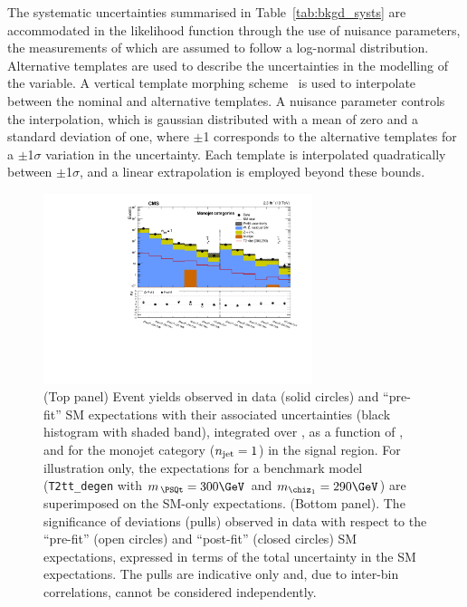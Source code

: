 The systematic uncertainties summarised in Table~\ref{tab:bkgd_systs}
are accommodated in the likelihood function through the use of
nuisance parameters, the measurements of which are assumed to follow a
log-normal distribution. Alternative templates are used to describe
the uncertainties in the modelling of the \HTmiss variable. A vertical
template morphing scheme~\cite{Prosper:2011zz} is used to interpolate
between the nominal and alternative \HTmiss templates. A nuisance
parameter controls the interpolation, which is gaussian distributed
with a mean of zero and a standard deviation of one, where $\pm$1
corresponds to the alternative templates for a $\pm$1$\sigma$
variation in the uncertainty. Each template is interpolated
quadratically between $\pm$1$\sigma$, and a linear extrapolation is
employed beyond these bounds.

\begin{figure}[!h]
  \begin{center}
    \includegraphics[width=0.7\textwidth]{figures/result/v1/summaryPlot_Monojet_prefit_overlay_fit_b}
    \caption{(Top panel) Event yields observed in data (solid circles)
      and ``pre-fit'' SM expectations with their associated
      uncertainties (black histogram with shaded band), integrated
      over \HTmiss, as a function of \nb, and \scalht for the monojet
      category ($n_{\text{jet}} = 1$) in the signal region. For illustration
      only, the expectations for a benchmark model
      (\texttt{T2tt\_degen} with $m_{\,\PSQt} = 300\GeV$ and
      $m_{\chiz_1} = 290\GeV$) are superimposed on the SM-only
      expectations. (Bottom panel). The significance of deviations
      (pulls) observed in data with respect to the ``pre-fit'' (open
      circles) and ``post-fit'' (closed circles) SM expectations,
      expressed in terms of the total uncertainty in the SM
      expectations. The pulls are indicative only and, due to
      inter-bin correlations, cannot be considered independently.}  
    \label{fig:mono}
  \end{center}
\end{figure}

